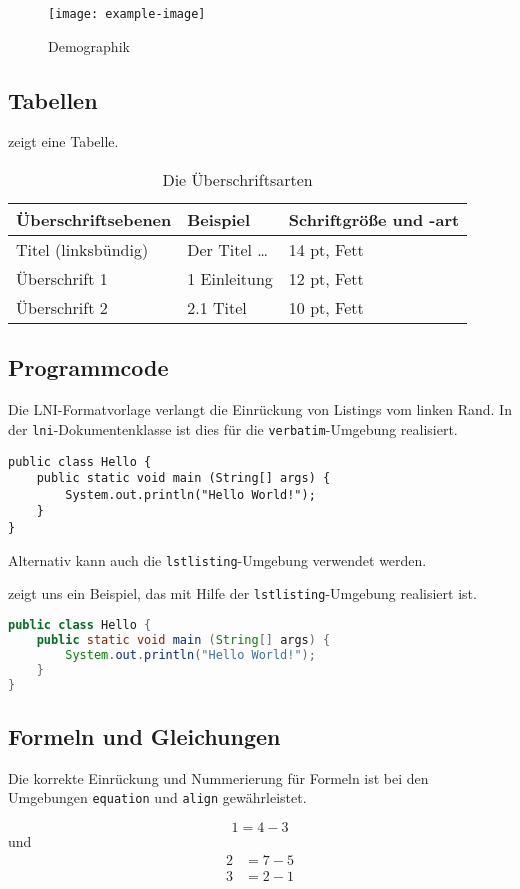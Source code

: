 \documentclass[utf8,biblatex]{lni}
\begin{document}
\begin{figure}
  \centering
  \texttt{[image: example-image]}
  \caption{Demographik}
  \label{fig:demo}
\end{figure}

\subsection{Tabellen}
 zeigt eine Tabelle.

\begin{table}
\centering
\begin{tabular}{lll}
\toprule
Überschriftsebenen & Beispiel & Schriftgröße und -art \\
\midrule
Titel (linksbündig) & Der Titel \ldots & 14 pt, Fett\\
Überschrift 1 & 1 Einleitung & 12 pt, Fett\\
Überschrift 2 & 2.1 Titel & 10 pt, Fett\\
\bottomrule
\end{tabular}
\caption{Die Überschriftsarten}
\label{tab:demo}
\end{table}

\subsection{Programmcode}
Die LNI-Formatvorlage verlangt die Einrückung von Listings vom linken Rand.
In der \texttt{lni}-Dokumentenklasse ist dies für die \texttt{verbatim}-Umgebung realisiert.

\begin{verbatim}
public class Hello {
    public static void main (String[] args) {
        System.out.println("Hello World!");
    }
}
\end{verbatim}

Alternativ kann auch die \texttt{lstlisting}-Umgebung verwendet werden.

 zeigt uns ein Beispiel, das mit Hilfe der \texttt{lstlisting}-Umgebung realisiert ist.

\begin{lstlisting}[caption={Beschreibung}, label=L1, language=Java]
public class Hello {
    public static void main (String[] args) {
        System.out.println("Hello World!");
    }
}
\end{lstlisting}

\subsection{Formeln und Gleichungen}

Die korrekte Einrückung und Nummerierung für Formeln ist bei den Umgebungen
\texttt{equation} und \texttt{align} gewährleistet.

\begin{equation}
  1=4-3
\end{equation}
und
\begin{align}
  2&=7-5\\
  3&=2-1
\end{align}

\printbibliography
\end{document}

